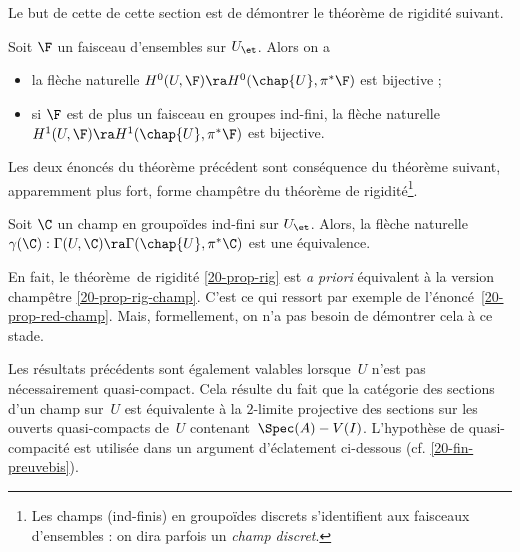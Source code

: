 \documentclass[10pt]{../fichiers-configuration-latex/smfart}
\begin{document}
Le but de cette de cette section est de démontrer le théorème de rigidité suivant.




\begin{theoreme2} \label{20-prop-rig} Soit $\F$ un faisceau
d'ensembles sur $U_\et$. Alors on a \begin{itemize} \item[i)] la flèche naturelle $H^0(U,\F)\ra
H^0(\chap{U},\pi^*\F)$ est bijective ; \item[ii)] si $\F$ est de plus un faisceau en groupes
ind-fini, la flèche naturelle $H^1(U,\F)\ra H^1(\chap{U},\pi^*\F)$ est bijective.  \end{itemize}
\end{theoreme2}

Les deux énoncés du théorème précédent sont conséquence du théorème suivant, apparemment plus fort,
forme champêtre du théorème de rigidité\footnote{Les champs (ind-finis) en groupoïdes discrets
s'identifient aux faisceaux d'ensembles : on dira parfois un \textit{champ discret}.}.


\begin{theoreme2} \label{20-prop-rig-champ} Soit
$\C$ un champ en groupoïdes ind-fini sur $U_\et$. Alors, la flèche naturelle
$\gamma(\C):\Gamma(U,\C)\ra \Gamma(\chap{U},\pi^*\C)$ est une équivalence.\end{theoreme2}



\begin{remarque2} En fait, le théorème~de rigidité \ref{20-prop-rig} est \textit{a priori}
équivalent à la version champêtre \ref{20-prop-rig-champ}. C'est ce qui ressort par exemple de
l'énoncé~\ref{20-prop-red-champ}. Mais, formellement, on n'a pas besoin de démontrer cela à ce
stade.\end{remarque2}

\begin{remarque2}
\label{20-U-non-qc}
 Les résultats précédents sont également valables lorsque $U$ n'est
pas nécessairement quasi-compact. Cela résulte du fait que
la catégorie des sections d'un champ sur $U$ est
équivalente à la $2$-limite projective des sections
sur les ouverts quasi-compacts de $U$ contenant $\Spec(A)-V(I)$.
L'hypothèse de quasi-compacité est utilisée dans un argument
d'éclatement ci-dessous (cf. \ref{20-fin-preuvebis}).
\end{remarque2}
\end{document}
